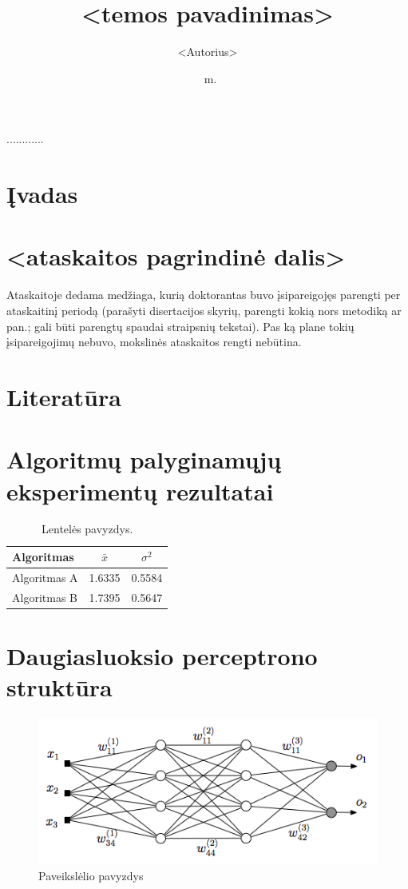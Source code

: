 \documentclass[12pt, a4paper, lithuanian]{article}
\date{\the\year\ m.\monthlt[\month]}
\title{<temos pavadinimas>}
\author{<Autorius>}
\begin{document}
\maketitle

\noindent
............


\tableofcontents

\section{Įvadas}

\section{<ataskaitos pagrindinė dalis>}
Ataskaitoje dedama medžiaga, kurią doktorantas buvo įsipareigojęs parengti per
ataskaitinį periodą (parašyti disertacijos skyrių, parengti kokią nors metodiką
ar pan.; gali būti parengtų spaudai straipsnių tekstai). Pas ką plane tokių
įsipareigojimų nebuvo, mokslinės ataskaitos rengti nebūtina.

\section{Literatūra}

% 

\appendix
\section{Algoritmų palyginamųjų eksperimentų rezultatai}
\begin{table}[H]
  \centering
  \caption{Lentelės pavyzdys.}
  {\begin{tabular}{|l|c|c|} \hline
    Algoritmas    & $\bar{x}$ & $\sigma^{2}$ \\
    \hline
    Algoritmas A  & 1.6335    & 0.5584       \\
    Algoritmas B  & 1.7395    & 0.5647       \\
    \hline
  \end{tabular}}
  \label{tab:table example}
\end{table}

\section{Daugiasluoksio perceptrono struktūra}
\begin{figure}[H]
    \centering
\includegraphics[scale=0.5]{img/MLP}
\caption{Paveikslėlio pavyzdys}
\end{figure}
\end{document}
